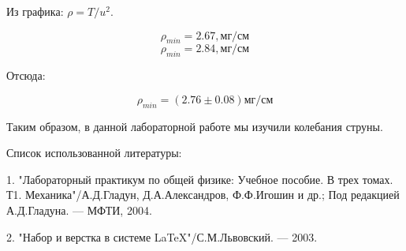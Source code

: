 \documentclass[14pt]{article}
\begin{document}
\vspace{1cm}
Из графика: $\rho = T/u^2$.

$$\rho_{min} = 2.67, \text{мг/см}$$
$$\rho_{min} = 2.84, \text{мг/см}$$

Отсюда:

$$\boxed{\boxed{\rho_{min} = (2.76 \pm 0.08) \text{мг/см}}}$$

\newpage
Таким образом, в данной лабораторной работе мы изучили колебания струны. 

\newpage
Список использованной литературы:
	
\vspace{0.5cm}
1. "Лабораторный практикум по общей физике: Учебное пособие. В трех томах. Т1. Механика"/А.Д.Гладун, Д.А.Александров,
Ф.Ф.Игошин и др.; Под редакцией А.Д.Гладуна. --- МФТИ, 2004.
	
2. "Набор и верстка в системе \LaTeX "/С.М.Львовский. --- 2003.
\end{document}
